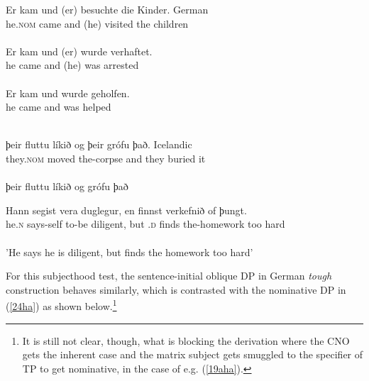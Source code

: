 \documentclass[output=paper,colorlinks,citecolor=brown,
]{langscibook}
\begin{document}
\begin{exe}
\ex \label{21ha}
\begin{xlist}
\ex \label{21aha}
\gll Er kam und (er) besuchte die Kinder. \hspace{25mm} German\\ 
he.\textsc{nom} came and (he) visited the children\\\\ 

\ex \label{21bha}
\gll Er kam und (er) wurde verhaftet.\\
he came and (he) was arrested \hspace{2mm} \citep[477]{ZaenenThrainsson1985}\\\\


\ex \label{21cha}
\gll *Er kam und \underline{\hspace{6mm}} wurde geholfen.\\
he came and {} was helped\\\\

\end{xlist}

\ex \label{22ha}
\begin{xlist}
\ex \label{22aha}
\gll ϸeir  fluttu  líkið og   ϸeir grófu   ϸað. 
\hspace{15mm} Icelandic\\
they.\textsc{nom} moved the-corpse and they buried it\\\\

\ex \label{22bha}
ϸeir fluttu líkið og \underline{\hspace{6mm}} grófu ϸað 

\ex \label{22cha}
\gll Hann segist vera duglegur, en \underline{\hspace{6mm}} finnst  verkefnið of ϸungt.\\
he.\textsc{n} says-self to-be diligent, but \underline{\hspace{6mm}}.\textsc{d} finds the-homework too hard\\\\           
'He says he is diligent, but finds the homework too hard' \citep[453-454]{ZaenenThráinsson1985}              
\end{xlist}

\end{exe}
For this subjecthood test, the sentence-initial oblique DP in German \textit{tough} construction behaves similarly, which is contrasted with the nominative DP in (\ref{24ha}) as shown below.\footnote{It is still not clear, though, what is blocking the derivation where the CNO gets the inherent case and the matrix subject gets smuggled to the specifier of TP to get nominative, in the case of e.g. (\ref{19aha}).}
\end{document}
